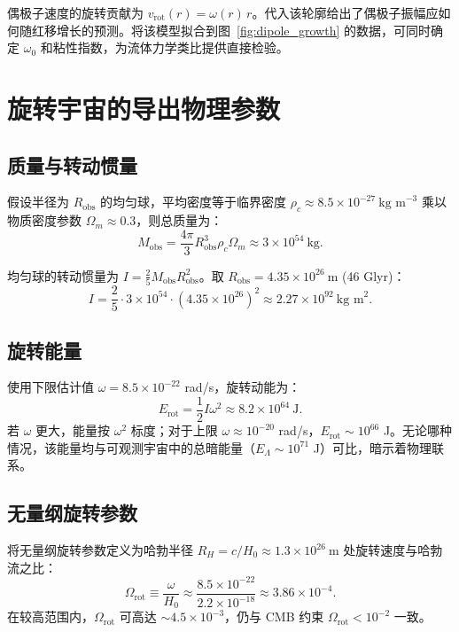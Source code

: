 \documentclass[11pt,a4paper]{article}
\newcommand{\Omegarot}{\Omega_{\mathrm{rot}}}
\begin{document}
	偶极子速度的旋转贡献为 \(v_{\mathrm{rot}}(r) = \omega(r) \, r\)。代入该轮廓给出了偶极子振幅应如何随红移增长的预测。将该模型拟合到图~\ref{fig:dipole_growth} 的数据，可同时确定 \(\omega_0\) 和粘性指数，为流体力学类比提供直接检验。
	
	\section{旋转宇宙的导出物理参数}
	
	\subsection{质量与转动惯量}
	
	假设半径为 \(R_{\text{obs}}\) 的均匀球，平均密度等于临界密度 \(\rho_c \approx 8.5\times10^{-27}\ \text{kg m}^{-3}\) 乘以物质密度参数 \(\Omega_m \approx 0.3\)，则总质量为：
	\begin{equation}
		M_{\text{obs}} = \frac{4\pi}{3} R_{\text{obs}}^3 \rho_c \Omega_m \approx 3 \times 10^{54}\ \text{kg}.
	\end{equation}
	
	均匀球的转动惯量为 \(I = \frac{2}{5} M_{\text{obs}} R_{\text{obs}}^2\)。取 \(R_{\text{obs}} = 4.35\times10^{26}\ \text{m}\) (46 Glyr)：
	\begin{equation}
		I = \frac{2}{5} \cdot 3\times10^{54} \cdot (4.35\times10^{26})^2 \approx 2.27 \times 10^{92}\ \text{kg m}^2.
	\end{equation}
	
	\subsection{旋转能量}
	
	使用下限估计值 \(\omega = 8.5\times10^{-22}\) rad/s，旋转动能为：
	\begin{equation}
		E_{\text{rot}} = \frac{1}{2} I \omega^2 \approx 8.2 \times 10^{64}\ \text{J}.
	\end{equation}
	若 \(\omega\) 更大，能量按 \(\omega^2\) 标度；对于上限 \(\omega \approx 10^{-20}\) rad/s，\(E_{\text{rot}} \sim 10^{66}\) J。无论哪种情况，该能量均与可观测宇宙中的总暗能量（\(E_{\Lambda} \sim 10^{71}\) J）可比，暗示着物理联系。
	
	\subsection{无量纲旋转参数}
	
	将无量纲旋转参数定义为哈勃半径 \(R_H = c/H_0 \approx 1.3\times10^{26}\ \text{m}\) 处旋转速度与哈勃流之比：
	\begin{equation}
		\Omegarot \equiv \frac{\omega}{H_0} \approx \frac{8.5\times10^{-22}}{2.2\times10^{-18}} \approx 3.86\times10^{-4}.
	\end{equation}
	在较高范围内，\(\Omegarot\) 可高达 \(\sim 4.5\times10^{-3}\)，仍与 CMB 约束 \(\Omegarot < 10^{-2}\) 一致。
	
\end{document}
